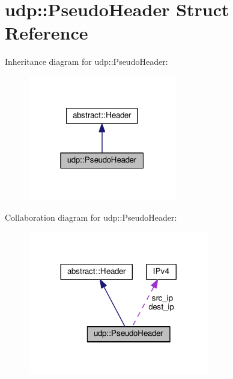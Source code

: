 \hypertarget{structudp_1_1PseudoHeader}{}\section{udp\+:\+:Pseudo\+Header Struct Reference}
\label{structudp_1_1PseudoHeader}


Inheritance diagram for udp\+:\+:Pseudo\+Header\+:\nopagebreak
\begin{figure}[H]
\begin{center}
\leavevmode
\includegraphics[width=183pt]{structudp_1_1PseudoHeader__inherit__graph}
\end{center}
\end{figure}


Collaboration diagram for udp\+:\+:Pseudo\+Header\+:
\nopagebreak
\begin{figure}[H]
\begin{center}
\leavevmode
\includegraphics[width=224pt]{structudp_1_1PseudoHeader__coll__graph}
\end{center}
\end{figure}

